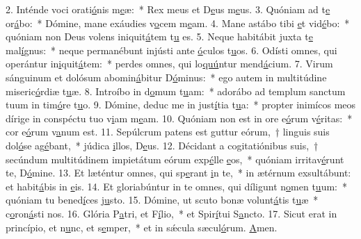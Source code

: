2. Inténde voci orati\uline{ó}nis m\uline{e}æ:~* Rex meus et D\uline{e}us m\uline{e}us.
3. Quóniam ad t\uline{e} or\uline{á}bo:~* Dómine, mane exáudies v\uline{o}cem m\uline{e}am.
4. Mane astábo tibi \uline{e}t vid\uline{é}bo:~* quóniam non Deus volens iniquit\uline{á}tem t\uline{u} es.
5. Neque habitábit juxta t\uline{e} mal\uline{í}gnus:~* neque permanébunt injústi ante \uline{ó}culos t\uline{u}os.
6. Odísti omnes, qui operántur in\uline{i}quit\uline{á}tem:~* perdes omnes, qui lo\uline{quú}ntur mend\uline{á}cium.
7. Virum sánguinum et dolósum abomin\uline{á}bitur D\uline{ó}minus:~* ego autem in multitúdine miseric\uline{ó}rdiæ t\uline{u}æ.
8. Introíbo in d\uline{o}mum t\uline{u}am:~* adorábo ad templum sanctum tuum in tim\uline{ó}re t\uline{u}o.
9. Dómine, deduc me in just\uline{í}tia t\uline{u}a:~* propter inimícos meos dírige in conspéctu tuo v\uline{i}am m\uline{e}am.
10. Quóniam non est in ore e\uline{ó}rum v\uline{é}ritas:~* cor e\uline{ó}rum v\uline{a}num est.
11. Sepúlcrum patens est guttur eórum,~† linguis suis dol\uline{ó}se ag\uline{é}bant,~* júdica \uline{i}llos, D\uline{e}us.
12. Décidant a cogitatiónibus suis,~† secúndum multitúdinem impietátum eórum exp\uline{é}lle \uline{e}os,~* quóniam irritav\uline{é}runt te, D\uline{ó}mine.
13. Et læténtur omnes, qui sp\uline{e}rant \uline{i}n te,~* in ætérnum exsultábunt: et habit\uline{á}bis in \uline{e}is.
14. Et gloriabúntur in te omnes, qui díligunt n\uline{o}men t\uline{u}um:~* quóniam tu bened\uline{í}ces j\uline{u}sto.
15. Dómine, ut scuto bonæ volunt\uline{á}tis t\uline{u}æ~* c\uline{o}ron\uline{á}sti nos.
16. Glória P\uline{a}tri, et F\uline{í}lio,~* et Spir\uline{í}tui S\uline{a}ncto.
17. Sicut erat in princípio, et n\uline{u}nc, et s\uline{e}mper,~* et in sǽcula sæcul\uline{ó}rum. \uline{A}men.
